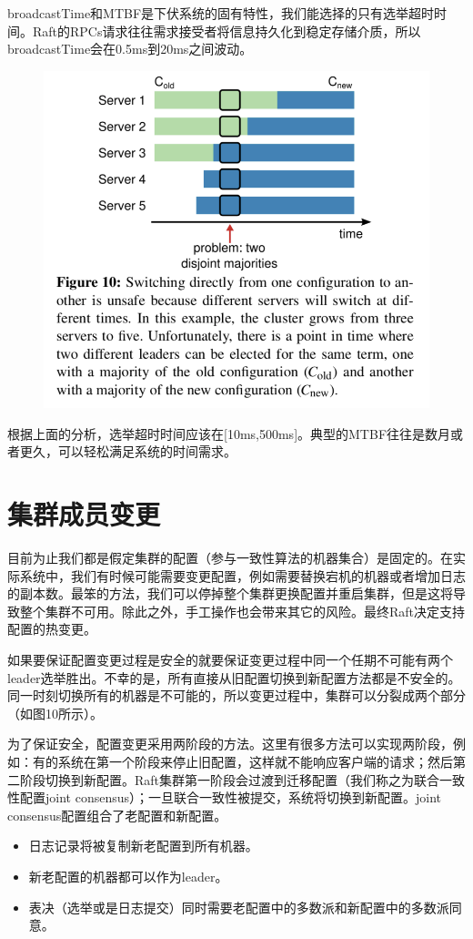 \documentclass[journal]{IEEEtran}
\begin{document}
broadcastTime和MTBF是下伏系统的固有特性，我们能选择的只有选举超时时间。Raft的RPCs请求往往需求接受者将信息持久化到稳定存储介质，所以broadcastTime会在0.5ms到20ms之间波动。
\begin{figure}[htbp]
\begin{center}
\includegraphics[width=1\linewidth]{./fig10.png}
\end{center}
\end{figure}
根据上面的分析，选举超时时间应该在[10ms,500ms]。典型的MTBF往往是数月或者更久，可以轻松满足系统的时间需求。


\section{集群成员变更}
目前为止我们都是假定集群的配置（参与一致性算法的机器集合）是固定的。在实际系统中，我们有时候可能需要变更配置，例如需要替换宕机的机器或者增加日志的副本数。最笨的方法，我们可以停掉整个集群更换配置并重启集群，但是这将导致整个集群不可用。除此之外，手工操作也会带来其它的风险。最终Raft决定支持配置的热变更。

如果要保证配置变更过程是安全的就要保证变更过程中同一个任期不可能有两个leader选举胜出。不幸的是，所有直接从旧配置切换到新配置方法都是不安全的。同一时刻切换所有的机器是不可能的，所以变更过程中，集群可以分裂成两个部分（如图10所示）。

为了保证安全，配置变更采用两阶段的方法。这里有很多方法可以实现两阶段，例如：有的系统在第一个阶段来停止旧配置，这样就不能响应客户端的请求；然后第二阶段切换到新配置。Raft集群第一阶段会过渡到迁移配置（我们称之为联合一致性配置joint consensus）；一旦联合一致性被提交，系统将切换到新配置。joint consensus配置组合了老配置和新配置。
\begin{itemize}
\item 日志记录将被复制新老配置到所有机器。
\item 新老配置的机器都可以作为leader。
\item 表决（选举或是日志提交）同时需要老配置中的多数派和新配置中的多数派同意。
\end{itemize}
\end{document}
